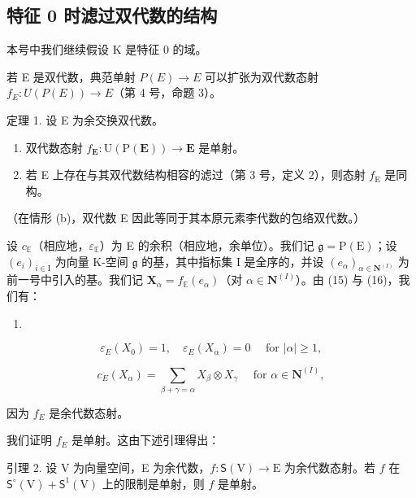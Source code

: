 \subsection{特征 0 时滤过双代数的结构}

本号中我们继续假设 K 是特征 0 的域。

若 E 是双代数，典范单射 \(P(E) \rightarrow E\) 可以扩张为双代数态射 \(f_{E}: U(P(E)) \rightarrow E\)（第 4 号，命题 3）。

定理 1. 设 E 为余交换双代数。

\begin{enumerate}
\def\labelenumi{(\alph{enumi})}
\item
  双代数态射 \(f_{\mathbf{E}} \colon \mathrm{U}(\mathrm{P}(\mathbf{E})) \to \mathbf{E}\) 是单射。
\item
  若 E 上存在与其双代数结构相容的滤过（第 3 号，定义 2），则态射 \(f_{\mathrm{E}}\) 是同构。
\end{enumerate}

（在情形 (b)，双代数 E 因此等同于其本原元素李代数的包络双代数。）

设 \(c_{\mathbb{E}}\)（相应地，\(\varepsilon_{\mathbb{E}}\)）为 E 的余积（相应地，余单位）。我们记 \(\mathfrak{g} = \mathrm{P}(\mathrm{E})\)；设 \((e_i)_{i \in \mathrm{I}}\) 为向量 K-空间 \(\mathfrak{g}\) 的基，其中指标集 I 是全序的，并设 \((e_\alpha)_{\alpha \in \mathbf{N}^{(I)}}\) 为前一号中引入的基。我们记 \(\mathbf{X}_\alpha = f_{\mathbb{E}}(e_\alpha)\)（对 \(\alpha \in \mathbf{N}^{(I)}\)）。由 (15) 与 (16)，我们有：

\begin{enumerate}
\def\labelenumi{(\arabic{enumi})}
\setcounter{enumi}{16}
\tightlist
\item
\end{enumerate}

\[
\varepsilon_ {E} (X _ {0}) = 1, \quad \varepsilon_ {E} (X _ {\alpha}) = 0 \quad \text { for } | \alpha | \geqslant 1,\tag{18}
\]

\[
c _ {E} (X _ {\alpha}) = \sum_ {\beta + \gamma = \alpha} X _ {\beta} \otimes X _ {\gamma} \quad \text { for } \alpha \in \mathbf {N} ^ {(I)},
\]

因为 \(f_{E}\) 是余代数态射。

我们证明 \(f_{E}\) 是单射。这由下述引理得出：

引理 2. 设 V 为向量空间，E 为余代数，\(f\colon\mathsf{S}(\mathrm{V})\to\mathrm{E}\) 为余代数态射。若 \(f\) 在 \(\mathsf{S}^{\circ}(\mathrm{V})+\mathsf{S}^{1}(\mathrm{V})\) 上的限制是单射，则 \(f\) 是单射。

